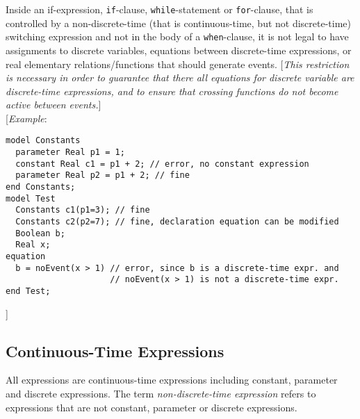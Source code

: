 Inside an if-expression, \lstinline!if!-clause, \lstinline!while!-statement or \lstinline!for!-clause, that
is controlled by a non-discrete-time (that is continuous-time, but not
discrete-time) switching expression and not in the body of a
\lstinline!when!-clause, it is not legal to have assignments to discrete variables,
equations between discrete-time expressions, or real elementary
relations/functions that should generate events. {[}\emph{This
restriction is necessary in order to guarantee that there all equations
for discrete variable are discrete-time expressions, and to ensure that
crossing functions do not become active between events.}{]}\\

{[}\emph{Example}:
\begin{lstlisting}[language=modelica]
model Constants
  parameter Real p1 = 1;
  constant Real c1 = p1 + 2; // error, no constant expression
  parameter Real p2 = p1 + 2; // fine
end Constants;
model Test
  Constants c1(p1=3); // fine
  Constants c2(p2=7); // fine, declaration equation can be modified
  Boolean b;
  Real x;
equation
  b = noEvent(x > 1) // error, since b is a discrete-time expr. and
                     // noEvent(x > 1) is not a discrete-time expr.
end Test;
\end{lstlisting}

{]}

\subsection{Continuous-Time Expressions}

All expressions are continuous-time expressions including constant,
parameter and discrete expressions. The term \emph{non-discrete-time
expression} refers to expressions that are not constant, parameter or
discrete expressions.
